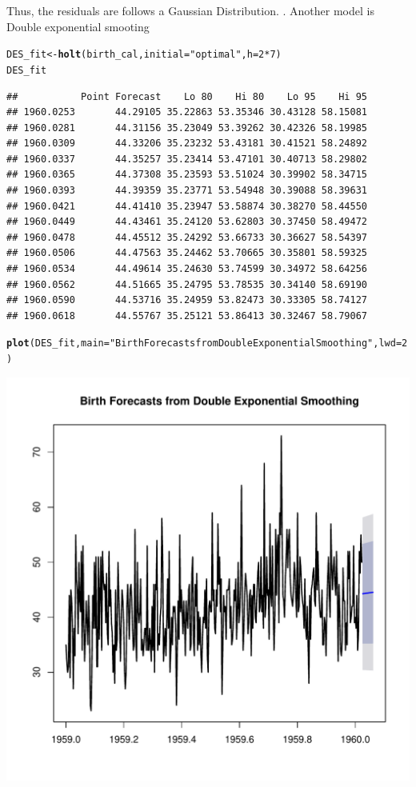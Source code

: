 \documentclass[10pt]{article}\usepackage[]{graphicx}\usepackage[]{color}
\makeatletter
\def\maxwidth{ %
  \ifdim\Gin@nat@width>\linewidth
    \linewidth
  \else
    \Gin@nat@width
  \fi
}
\newcommand{\hlnum}[1]{\textcolor[rgb]{0.686,0.059,0.569}{#1}}%
\newcommand{\hlstr}[1]{\textcolor[rgb]{0.192,0.494,0.8}{#1}}%
\newcommand{\hlopt}[1]{\textcolor[rgb]{0,0,0}{#1}}%
\newcommand{\hlstd}[1]{\textcolor[rgb]{0.345,0.345,0.345}{#1}}%
\newcommand{\hlkwb}[1]{\textcolor[rgb]{0.69,0.353,0.396}{#1}}%
\newcommand{\hlkwc}[1]{\textcolor[rgb]{0.333,0.667,0.333}{#1}}%
\newcommand{\hlkwd}[1]{\textcolor[rgb]{0.737,0.353,0.396}{\textbf{#1}}}%
\newenvironment{kframe}{%
 \def\at@end@of@kframe{}%
 \ifinner\ifhmode%
  \def\at@end@of@kframe{\end{minipage}}%
  \begin{minipage}{\columnwidth}%
 \fi\fi%
 \def\FrameCommand##1{\hskip\@totalleftmargin \hskip-\fboxsep
 \colorbox{shadecolor}{##1}\hskip-\fboxsep
     \hskip-\linewidth \hskip-\@totalleftmargin \hskip\columnwidth}%
 \MakeFramed {\advance\hsize-\width
   \@totalleftmargin\z@ \linewidth\hsize
   \@setminipage}}%
 {\par\unskip\endMakeFramed%
 \at@end@of@kframe}
\newenvironment{knitrout}{}{} %
\makeatother
\begin{document}
Thus, the residuals are follows a Gaussian Distribution.
. Another model is Double exponential smooting
\begin{knitrout}
\color{fgcolor}\begin{kframe}
\begin{alltt}
\hlstd{DES_fit} \hlkwb{<-} \hlkwd{holt}\hlstd{(birth_cal,} \hlkwc{initial} \hlstd{=} \hlstr{"optimal"}\hlstd{,} \hlkwc{h} \hlstd{=}\hlnum{2}\hlopt{*}\hlnum{7}\hlstd{)}
\hlstd{DES_fit}
\end{alltt}
\begin{verbatim}
##           Point Forecast    Lo 80    Hi 80    Lo 95    Hi 95
## 1960.0253       44.29105 35.22863 53.35346 30.43128 58.15081
## 1960.0281       44.31156 35.23049 53.39262 30.42326 58.19985
## 1960.0309       44.33206 35.23232 53.43181 30.41521 58.24892
## 1960.0337       44.35257 35.23414 53.47101 30.40713 58.29802
## 1960.0365       44.37308 35.23593 53.51024 30.39902 58.34715
## 1960.0393       44.39359 35.23771 53.54948 30.39088 58.39631
## 1960.0421       44.41410 35.23947 53.58874 30.38270 58.44550
## 1960.0449       44.43461 35.24120 53.62803 30.37450 58.49472
## 1960.0478       44.45512 35.24292 53.66733 30.36627 58.54397
## 1960.0506       44.47563 35.24462 53.70665 30.35801 58.59325
## 1960.0534       44.49614 35.24630 53.74599 30.34972 58.64256
## 1960.0562       44.51665 35.24795 53.78535 30.34140 58.69190
## 1960.0590       44.53716 35.24959 53.82473 30.33305 58.74127
## 1960.0618       44.55767 35.25121 53.86413 30.32467 58.79067
\end{verbatim}
\begin{alltt}
\hlkwd{plot}\hlstd{(DES_fit,}\hlkwc{main} \hlstd{=} \hlstr{"Birth Forecasts from Double Exponential Smoothing"}\hlstd{,} \hlkwc{lwd} \hlstd{=} \hlnum{2}\hlstd{)}
\end{alltt}
\end{kframe}
\includegraphics[width=\maxwidth]{figure/unnamed-chunk-13-1} 

\end{knitrout}
\end{document}
